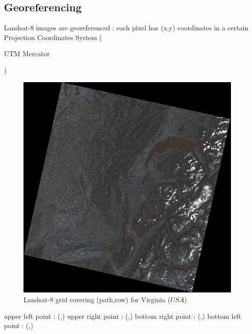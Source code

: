 \documentclass{beamer}
\begin{document}
\subsection{Georeferencing}

\begin{frame}
Landsat-8 images are georeferenced : each pixel has (x,y) coordinates in a certain Projection Coordinates 
System (\begin{itshape}UTM Mercator\end{itshape})\\
\begin{minipage}{.5\textwidth}
\begin{figure}
  \includegraphics[scale=0.2]{images/georeferencing/Thonon_landsat.png}
  \caption{Landsat-8 grid covering (path,row) for Virginia ($USA$) }
\end{figure}
\end{minipage}
\begin{minipage}{.5\textwidth}
 upper left point : (,)
 upper right point : (,)
 bottom right point : (,)
 bottom left point : (,)
\end{minipage}



\end{frame}
\end{document}
